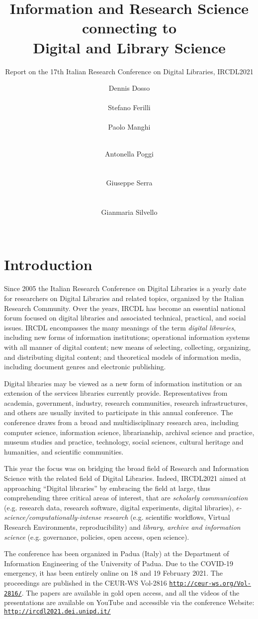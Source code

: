 \documentclass{sig-alternate-10pt}
\title{Information and Research Science connecting to \\ Digital and Library Science}
\subtitle{Report on the 17th Italian Research Conference on Digital Libraries, IRCDL2021}
\author{
\alignauthor
Dennis Dosso\\
\affaddr{University of Padova}\\
\affaddr{Padua, Italy}
\email{dennis.dosso@unipd.it}
\alignauthor
Stefano Ferilli\\
\affaddr{University of Bari}\\
\affaddr{Bari, Italy}
\email{stefano.ferilli@uniba.it}
\alignauthor
Paolo Manghi\\
\affaddr{{ISTI - Consiglio Nazionale delle Ricerche}}\\
\affaddr{Pisa, Italy}
\email{manghi@isti.cnr.it}
\and
Antonella Poggi\\
\affaddr{``La Sapienza'', University of Rome}\\
\affaddr{Rome, Italy}\\
\email{antonella.poggi@uniroma1.it}
\alignauthor
Giuseppe Serra\\
\affaddr{University of Udine}\\
\affaddr{Udine, Italy}\\
\email{giuseppe.serra@uniud.it}
\alignauthor
Gianmaria Silvello\\
\affaddr{University of Padova}\\
\affaddr{Padua, Italy}
\email{gianmaria.silvello@unipd.it}}
\begin{document}
\maketitle
\pagestyle{empty}

\section{Introduction}
Since 2005 the Italian Research Conference on Digital Libraries is a yearly date for researchers on Digital Libraries and related topics, organized by the Italian Research Community. Over the years, IRCDL has become an essential national forum focused on digital libraries and associated technical, practical, and social issues. IRCDL encompasses the many meanings of the term \emph{digital libraries}, including new forms of information institutions; operational information systems with all manner of digital content; new means of selecting, collecting, organizing, and distributing digital content; and theoretical models of information media, including document genres and electronic publishing. 

Digital libraries may be viewed as a new form of information institution or an extension of the services libraries currently provide. Representatives from academia, government, industry, research communities, research infrastructures, and others are usually invited to participate in this annual conference. The conference draws from a broad and multidisciplinary research area, including computer science, information science, librarianship, archival science and practice, museum studies and practice, technology, social sciences, cultural heritage and humanities, and scientific communities. 

This year the focus was on bridging the broad field of Research and Information Science with the related field of Digital Libraries. Indeed, IRCDL2021 aimed at approaching ``Digital libraries'' by embracing the field at large, thus comprehending three critical areas of interest, that are \emph{scholarly communication} (e.g. research data, research software, digital experiments, digital libraries), \emph{e-science/com\-put\-ationally-intense research} (e.g. scientific workflows, Virtual Research Environments, reproducibility) and \emph{library, archive and information science} (e.g. governance, policies, open access, open science).

The conference has been organized in Padua (Italy) at the Department of Information Engineering of the University of Padua. Due to the COVID-19 emergency, it has been entirely online on 18 and 19 February 2021. The proceedings are published in the CEUR-WS  Vol-2816 \texttt{\url{http://ceur-ws.org/Vol-2816/}}. The papers are available in gold open access, and all the videos of the presentations are available on YouTube and accessible via the conference Website: \texttt{\url{http://ircdl2021.dei.unipd.it/}}
\end{document}
